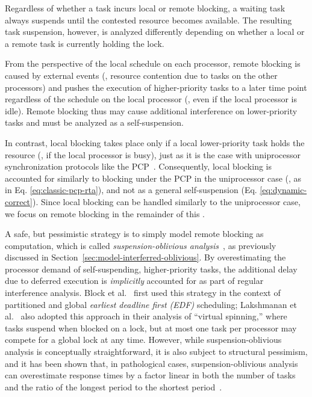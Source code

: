 Regardless of whether a task incurs local or remote blocking, a waiting task always suspends until the contested resource becomes available. The resulting task suspension, however, is analyzed differently depending on whether a local or a remote task is currently holding the lock.

From the perspective of the local schedule on each processor, remote blocking is caused by external events (\ie, resource contention due to tasks on the other processors) and pushes the execution of higher-priority tasks to a later time point regardless of the schedule on the local processor (\ie, even if the local processor is idle). Remote blocking thus may cause additional interference on lower-priority tasks and must be analyzed as a self-suspension.

In contrast, local blocking takes place only if a local lower-priority task holds the resource (\ie, if the local processor is busy), just as it is the case with uniprocessor synchronization protocols like the PCP~\cite{SRL:90}. Consequently, local blocking is accounted for similarly to blocking under the PCP in the uniprocessor case (\ie, as in Eq. \eqref{eq:classic-pcp-rta}), and not as a general self-suspension (Eq. \eqref{eq:dynamic-correct}). Since local blocking can be handled similarly to the uniprocessor case, we focus on remote blocking in the remainder of this \mysectionrefnormal{}.


A safe, but pessimistic strategy is to simply model remote blocking as computation, which is called \emph{suspension-oblivious analysis}~\cite{BA:10b}, as previously discussed in Section~\ref{sec:model-interferred-oblivious}. By overestimating the processor demand of self-suspending, higher-priority tasks, the additional delay due to deferred execution is \emph{implicitly} accounted for as part of regular interference analysis. Block et al.~\cite{block-2007} first used this strategy in the context of partitioned and global \emph{earliest deadline first (EDF)} scheduling; Lakshmanan et al.~\cite{lakshmanan-2009} also adopted this approach in their analysis of ``virtual spinning,'' where tasks suspend when blocked on a lock, but at most one task per processor may compete for a global lock at any time. However, while suspension-oblivious analysis is conceptually straightforward, it is also subject to structural pessimism, and it has been shown that, in pathological cases, suspension-oblivious analysis can overestimate response times by a factor linear in both the number of tasks and the ratio of the longest period to the shortest period~\cite{wieder-2013}.

